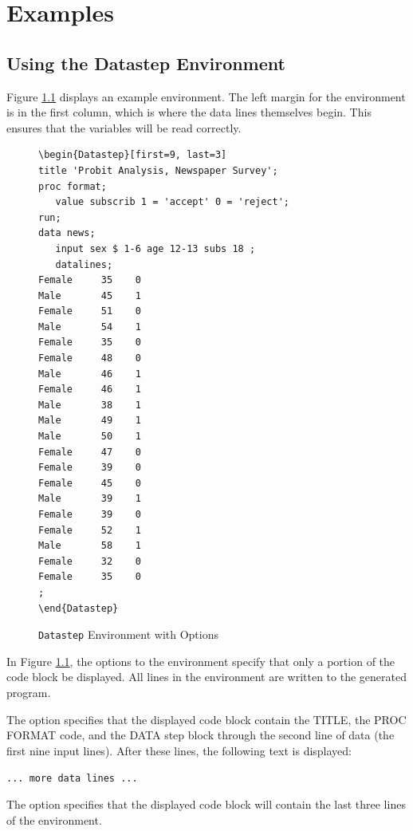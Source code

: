 \documentclass[article,oneside]{memoir}
\begin{document}
\chapter{Examples}

\section{Using the Datastep Environment}\label{dsex}
  Figure \ref{fig:sd2} displays an example  environment. The left margin for
  the environment is in the first column, which is where the data lines themselves begin.
  This ensures that the variables will be read correctly.

\begin{figure}[H]
\begin{snugshade}
\begin{verbatim}
\begin{Datastep}[first=9, last=3]
title 'Probit Analysis, Newspaper Survey';
proc format;
   value subscrib 1 = 'accept' 0 = 'reject';
run;
data news;
   input sex $ 1-6 age 12-13 subs 18 ;
   datalines;
Female     35    0
Male       45    1
Female     51    0
Male       54    1
Female     35    0
Female     48    0
Male       46    1
Female     46    1
Male       38    1
Male       49    1
Male       50    1
Female     47    0
Female     39    0
Female     45    0
Male       39    1
Female     39    0
Female     52    1
Male       58    1
Female     32    0
Female     35    0
;
\end{Datastep}
\end{verbatim}
\end{snugshade}
\caption{\texttt{Datastep} Environment with Options}\label{fig:sd2}
\end{figure}

  In Figure \ref{fig:sd2}, the options to the  environment specify that only a portion
  of the code block be displayed.  All lines in the environment are written to the
  generated program.

  The option  specifies that the displayed code
  block contain the TITLE, the PROC FORMAT code, and the DATA step block through the
  second line of data (the first nine input lines). After these lines, the
  following text is displayed:\par\texttt{... more data lines ...}

  The option  specifies that the displayed code block
  will contain the last three lines of the environment.
\end{document}
